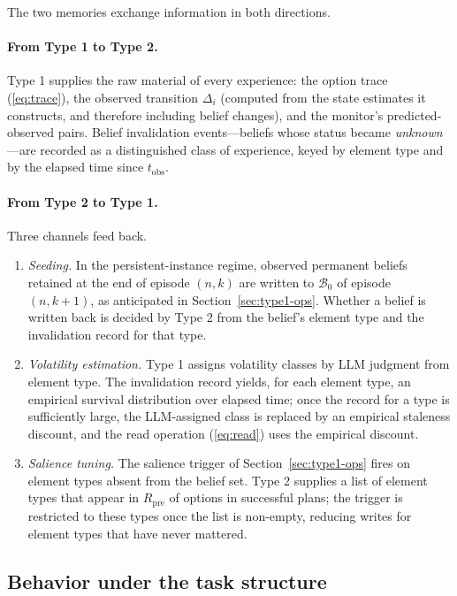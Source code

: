 \documentclass[11pt]{article}
\newcommand{\calB}{\mathcal{B}}
\newcommand{\Rel}{R}
\begin{document}
The two memories exchange information in both directions.

\paragraph{From Type 1 to Type 2.}
Type 1 supplies the raw material of every experience: the option trace (\ref{eq:trace}), the observed transition $\Delta_i$ (computed from the state estimates it constructs, and therefore including belief changes), and the monitor's predicted-observed pairs. Belief invalidation events---beliefs whose status became \emph{unknown}---are recorded as a distinguished class of experience, keyed by element type and by the elapsed time since $t_{\mathrm{obs}}$.

\paragraph{From Type 2 to Type 1.}
Three channels feed back.
\begin{enumerate}[leftmargin=1.5em,itemsep=1pt]
\item \emph{Seeding.} In the persistent-instance regime, observed permanent beliefs retained at the end of episode $(n,k)$ are written to $\calB_0$ of episode $(n,k+1)$, as anticipated in Section~\ref{sec:type1-ops}. Whether a belief is written back is decided by Type 2 from the belief's element type and the invalidation record for that type.
\item \emph{Volatility estimation.} Type 1 assigns volatility classes by LLM judgment from element type. The invalidation record yields, for each element type, an empirical survival distribution over elapsed time; once the record for a type is sufficiently large, the LLM-assigned class is replaced by an empirical staleness discount, and the read operation (\ref{eq:read}) uses the empirical discount.
\item \emph{Salience tuning.} The salience trigger of Section~\ref{sec:type1-ops} fires on element types absent from the belief set. Type 2 supplies a list of element types that appear in $\Rel_{\mathrm{pre}}$ of options in successful plans; the trigger is restricted to these types once the list is non-empty, reducing writes for element types that have never mattered.
\end{enumerate}

\subsection{Behavior under the task structure}
\label{sec:type2-tasks}
\end{document}
